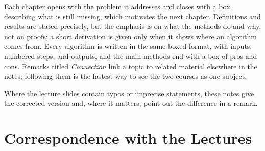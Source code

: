 Each chapter opens with the problem it addresses and closes with a box describing what is still missing, which motivates the next chapter. Definitions and results are stated precisely, but the emphasis is on what the methods do and why, not on proofs; a short derivation is given only when it shows where an algorithm comes from. Every algorithm is written in the same boxed format, with inputs, numbered steps, and outputs, and the main methods end with a box of pros and cons. Remarks titled \emph{Connection} link a topic to related material elsewhere in the notes; following them is the fastest way to see the two courses as one subject.

Where the lecture slides contain typos or imprecise statements, these notes give the corrected version and, where it matters, point out the difference in a remark.

\section*{Correspondence with the Lectures}

